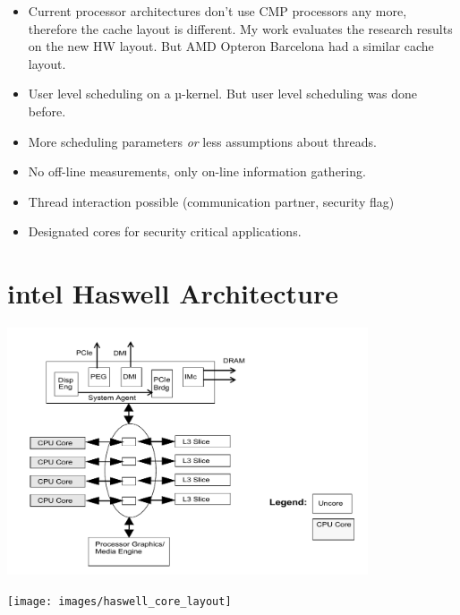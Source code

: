 \begin{itemize}
  \item Current processor architectures don't use CMP processors any more, therefore
    the cache layout is different. My work evaluates the research results on the
    new HW layout. But AMD Opteron Barcelona had a similar cache layout.
  \item User level scheduling on a $µ$-kernel. But user level scheduling was
    done before.
  \item More scheduling parameters \textit{or} less assumptions about threads.
  \item No off-line measurements, only on-line information gathering.
  \item Thread interaction possible (communication partner, security flag)
  \item Designated cores for security critical applications.
\end{itemize}



\section{\gls{intel} Haswell Architecture}
\label{state:haswell}

\includegraphics[width=0.8\textwidth]{images/haswell_architecture_by_intel_large}

\texttt{[image: images/haswell\_core\_layout]}


